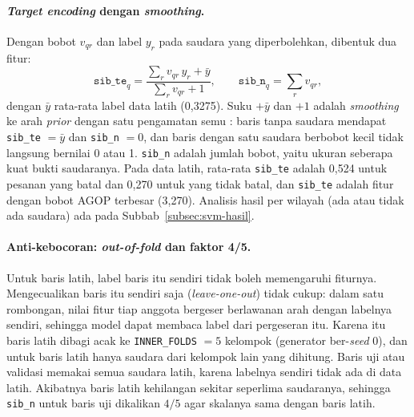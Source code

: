 \paragraph{\textit{Target encoding} dengan \textit{smoothing}.} Dengan bobot $v_{qr}$ dan label $y_r$ pada saudara yang diperbolehkan, dibentuk dua fitur:
\begin{equation}
	\texttt{sib\_te}_q = \frac{\sum_{r} v_{qr}\,y_r + \bar{y}}{\sum_{r} v_{qr} + 1}, \qquad \texttt{sib\_n}_q = \sum_{r} v_{qr},
\end{equation}
dengan $\bar{y}$ rata-rata label data latih (0,3275). Suku $+\bar{y}$ dan $+1$ adalah \textit{smoothing} ke arah \textit{prior} dengan satu pengamatan semu \cite{micci2001target,pargent2022target}: baris tanpa saudara mendapat \texttt{sib\_te} $= \bar{y}$ dan \texttt{sib\_n} $= 0$, dan baris dengan satu saudara berbobot kecil tidak langsung bernilai 0 atau 1. \texttt{sib\_n} adalah jumlah bobot, yaitu ukuran seberapa kuat bukti saudaranya. Pada data latih, rata-rata \texttt{sib\_te} adalah 0,524 untuk pesanan yang batal dan 0,270 untuk yang tidak batal, dan \texttt{sib\_te} adalah fitur dengan bobot AGOP terbesar (3,270). Analisis hasil per wilayah (ada atau tidak ada saudara) ada pada Subbab~\ref{subsec:svm-hasil}.



\paragraph{Anti-kebocoran: \textit{out-of-fold} dan faktor 4/5.} Untuk baris latih, label baris itu sendiri tidak boleh memengaruhi fiturnya. Mengecualikan baris itu sendiri saja (\textit{leave-one-out}) tidak cukup: dalam satu rombongan, nilai fitur tiap anggota bergeser berlawanan arah dengan labelnya sendiri, sehingga model dapat membaca label dari pergeseran itu. Karena itu baris latih dibagi acak ke \texttt{INNER\_FOLDS} $= 5$ kelompok (generator ber-\textit{seed} 0), dan untuk baris latih hanya saudara dari kelompok lain yang dihitung. Baris uji atau validasi memakai semua saudara latih, karena labelnya sendiri tidak ada di data latih. Akibatnya baris latih kehilangan sekitar seperlima saudaranya, sehingga \texttt{sib\_n} untuk baris uji dikalikan $4/5$ agar skalanya sama dengan baris latih.

